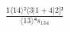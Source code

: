 \documentclass[varwidth, border=5pt]{standalone}
\begin{document}
\begin{my}
$\begin{gathered}
\scriptscriptstyle\frac{1⟨14⟩²⟨3|1+4|2]²}{⟨13⟩⁴s_{134}}
\end{gathered}$
\end{my}
\end{document}
